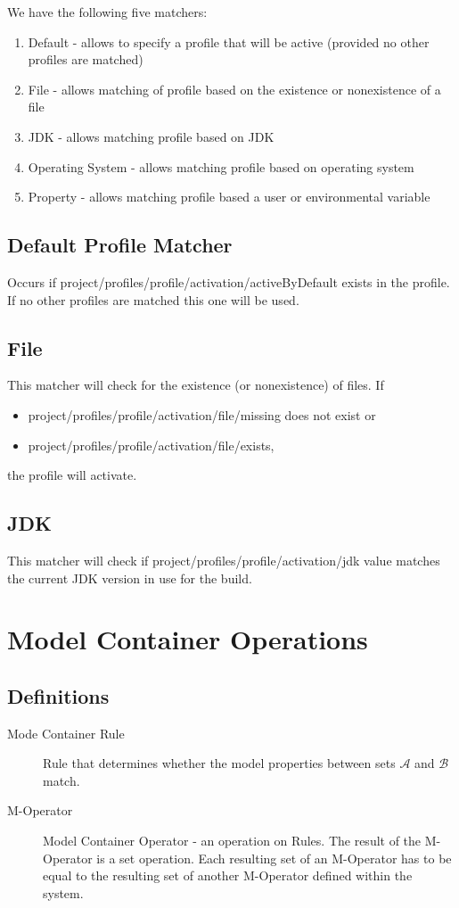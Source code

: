 \documentclass[12pt]{amsart}
\begin{document}
We have the following five matchers:
\begin{enumerate}
\item Default - allows to specify a profile that will be active (provided no other profiles are matched)
\item File - allows matching of profile based on the existence or nonexistence of a file
\item JDK - allows matching profile based on JDK
\item Operating System - allows matching profile based on operating system
\item Property - allows matching profile based a user or environmental variable
\end{enumerate}

\subsection{Default Profile Matcher}
Occurs if 
project/profiles/profile/activation/activeByDefault 
exists in the profile. If no other profiles are matched this one will be used.

\subsection{File}
This matcher will check for the existence (or nonexistence) of files. If 
\begin{itemize}
\item project/profiles/profile/activation/file/missing does not exist or
\item project/profiles/profile/activation/file/exists, 
\end{itemize}

the profile will activate.

\subsection{JDK}
This matcher will check if project/profiles/profile/activation/jdk value matches the current JDK version in use for the build.

\section{Model Container Operations}
\subsection{Definitions}
\begin{description}
\item[Mode Container Rule] Rule that determines whether the model properties between sets \begin{math} \mathcal{A}\end{math} and  \begin{math} \mathcal{B}\end{math} match.  
\item[M-Operator] Model Container Operator - an operation on Rules. The result of the M-Operator is a set operation. Each resulting set of an M-Operator has to be equal to the resulting set of another M-Operator defined within the system.
\end{description}
\end{document}
